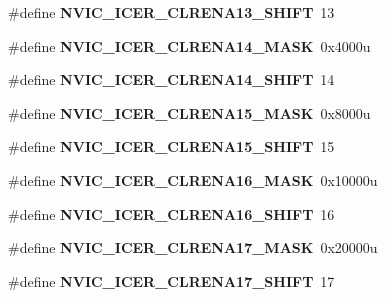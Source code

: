 \begin{DoxyCompactItemize}
\#define {\bfseries N\+V\+I\+C\+\_\+\+I\+C\+E\+R\+\_\+\+C\+L\+R\+E\+N\+A13\+\_\+\+S\+H\+I\+FT}~13
\item 
\mbox{\label{group___n_v_i_c___register___masks_ga0484cb1c29bdc9d3b06d63d0a0c093a5}} 
\#define {\bfseries N\+V\+I\+C\+\_\+\+I\+C\+E\+R\+\_\+\+C\+L\+R\+E\+N\+A14\+\_\+\+M\+A\+SK}~0x4000u
\item 
\mbox{\label{group___n_v_i_c___register___masks_ga61d47d4b69bc979ee9f4b3a1dbe9aa02}} 
\#define {\bfseries N\+V\+I\+C\+\_\+\+I\+C\+E\+R\+\_\+\+C\+L\+R\+E\+N\+A14\+\_\+\+S\+H\+I\+FT}~14
\item 
\mbox{\label{group___n_v_i_c___register___masks_ga73c9a1d71120aa74adec64e5a30449ae}} 
\#define {\bfseries N\+V\+I\+C\+\_\+\+I\+C\+E\+R\+\_\+\+C\+L\+R\+E\+N\+A15\+\_\+\+M\+A\+SK}~0x8000u
\item 
\mbox{\label{group___n_v_i_c___register___masks_ga1a02d8fbd55a56b61d882763daadef56}} 
\#define {\bfseries N\+V\+I\+C\+\_\+\+I\+C\+E\+R\+\_\+\+C\+L\+R\+E\+N\+A15\+\_\+\+S\+H\+I\+FT}~15
\item 
\mbox{\label{group___n_v_i_c___register___masks_ga8b7e4508bda83497b3fdc6fbf1dd5bf6}} 
\#define {\bfseries N\+V\+I\+C\+\_\+\+I\+C\+E\+R\+\_\+\+C\+L\+R\+E\+N\+A16\+\_\+\+M\+A\+SK}~0x10000u
\item 
\mbox{\label{group___n_v_i_c___register___masks_gae317530c9facd1d0d632fdcdb45fa20b}} 
\#define {\bfseries N\+V\+I\+C\+\_\+\+I\+C\+E\+R\+\_\+\+C\+L\+R\+E\+N\+A16\+\_\+\+S\+H\+I\+FT}~16
\item 
\mbox{\label{group___n_v_i_c___register___masks_gad608e6b4308ec1b247749e494a99014e}} 
\#define {\bfseries N\+V\+I\+C\+\_\+\+I\+C\+E\+R\+\_\+\+C\+L\+R\+E\+N\+A17\+\_\+\+M\+A\+SK}~0x20000u
\item 
\mbox{\label{group___n_v_i_c___register___masks_ga4de9e2d8a383f4b5fc4990582f0dc1fa}} 
\#define {\bfseries N\+V\+I\+C\+\_\+\+I\+C\+E\+R\+\_\+\+C\+L\+R\+E\+N\+A17\+\_\+\+S\+H\+I\+FT}~17

\end{DoxyCompactItemize}
